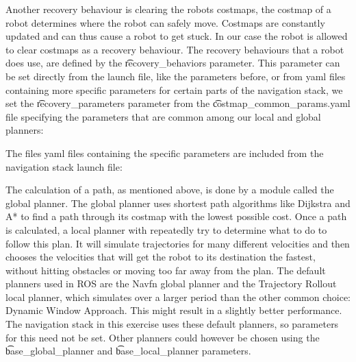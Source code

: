 

Another recovery behaviour is clearing the robots costmaps, the costmap of a robot determines where the robot can safely move. Costmaps are constantly updated and can thus cause a robot to get stuck. In our case the robot is allowed to clear costmaps as a recovery behaviour. The recovery behaviours that a robot does use, are defined by the \t{recovery\_behaviors} parameter. This parameter can be set directly from the launch file, like the parameters before, or from yaml files containing more specific parameters for certain parts of the navigation stack, we set the \t{recovery\_parameters} parameter from the \t{costmap_common_params.yaml} file specifying the parameters that are common among our local and global planners:



The files yaml files containing the specific parameters are included from the navigation stack launch file:



The calculation of a path, as mentioned above, is done by a module called the global planner. The global planner uses shortest path algorithms like Dijkstra and A* to find a path through its costmap with the lowest possible cost. Once a path is calculated, a local planner with repeatedly try to determine what to do to follow this plan. It will simulate trajectories for many different velocities and then chooses the velocities that will get the robot to its destination the fastest, without hitting obstacles or moving too far away from the plan. The default planners used in ROS are the Navfn global planner and the Trajectory Rollout local planner, which simulates over a larger period than the other common choice: Dynamic Window Approach. This might result in a slightly better performance. The navigation stack in this exercise uses these default planners, so parameters for this need not be set. Other planners could however be chosen using the \t{base\_global\_planner} and \t{base\_local\_planner} parameters.


